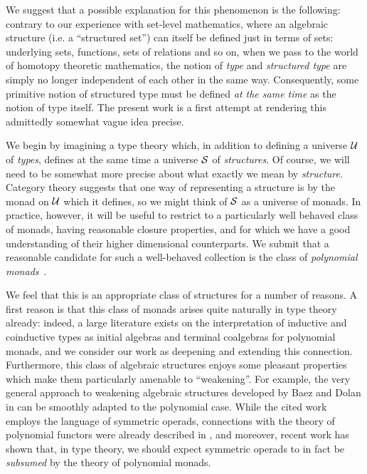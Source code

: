 We suggest that a possible explanation for this phenomenon is the
following: contrary to our experience with set-level mathematics,
where an algebraic structure (i.e. a ``structured set'') can itself be
defined just in terms of sets: underlying sets, functions, sets of
relations and so on, when we pass to the world of homotopy theoretic
mathematics, the notion of \emph{type} and \emph{structured type} are
simply no longer independent of each other in the same way.
Consequently, some primitive notion of structured type must be defined
\emph{at the same time} as the notion of type itself.  The present
work is a first attempt at rendering this admittedly somewhat vague
idea precise.

We begin by imagining a type theory which, in addition to defining a
universe $\mathcal{U}$ of \emph{types}, defines at the same time a universe
$\mathcal{S}$ of \emph{structures}. Of course, we will need to be somewhat
more precise about what exactly we mean by \emph{structure}.  Category
theory suggests that one way of representing a structure is by the
monad on $\mathcal{U}$ which it defines, so we might think of $\mathcal{S}$ as a
universe of monads.  In practice, however, it will be useful to
restrict to a particularly well behaved class of monads, having
reasonable closure properties, and for which we have a good
understanding of their higher dimensional counterparts.  We submit
that a reasonable candidate for such a well-behaved collection is the
class of \emph{polynomial monads}~\cite{GK}.

We feel that this is an appropriate class of structures for a number
of reasons.  A first reason is that this class of monads arises quite
naturally in type theory already: indeed, a large literature exists on
the interpretation of inductive and coinductive types as initial
algebras and terminal coalgebras for polynomial monads, and we
consider our work as deepening and extending this connection.
Furthermore, this class of algebraic structures enjoys some pleasant
properties which make them particularly amenable to ``weakening''.
For example, the very general approach to weakening algebraic
structures developed by Baez and Dolan in \cite{BD98} can be smoothly
adapted to the polynomial case. While the cited work employs the
language of symmetric operads, connections with the theory of
polynomial functors were already described in \cite{KJBM}, and
moreover, recent work \cite{gepner2017infty} has shown that, in type
theory, we should expect symmetric operads to in fact be
\emph{subsumed} by the theory of polynomial monads.

